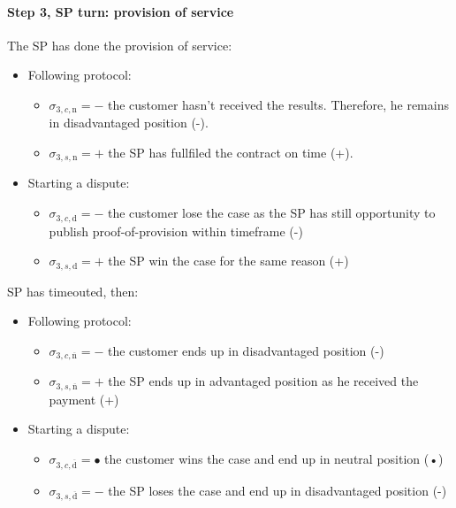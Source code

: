 \documentclass{ieeeaccess}
\begin{document}
\paragraph{Step 3, SP turn: provision of
service}\label{step-3-provision-of-service}

The SP has done the provision of service:

\begin{itemize}
\item
  Following protocol:

  \begin{itemize}
  
  \item
    \(\sigma_{3, c, \mathrm{n}} = -\) the customer hasn't received the
    results. Therefore, he remains in disadvantaged position (-).
  \item
    \(\sigma_{3, s, \mathrm{n}} = +\) the SP has fullfiled the contract
    on time (+).
  \end{itemize}
\item
  Starting a dispute:

  \begin{itemize}
  
  \item
    \(\sigma_{3, c, \mathrm{d}} = -\) the customer lose the case as the
    SP has still opportunity to publish proof-of-provision within
    timeframe (-)
  \item
    \(\sigma_{3, s, \mathrm{d}} = +\) the SP win the case for the same
    reason (+)
  \end{itemize}
\end{itemize}

SP has timeouted, then:

\begin{itemize}
\item
  Following protocol:

  \begin{itemize}
  
  \item
    \(\sigma_{3, c, \overline{\mathrm{n}}} = -\) the customer ends up in
    disadvantaged position (-)
  \item
    \(\sigma_{3, s, \overline{\mathrm{n}}} = +\) the SP ends up in
    advantaged position as he received the payment (+)
  \end{itemize}
\item
  Starting a dispute:

  \begin{itemize}
  
  \item
    \(\sigma_{3, c, \overline{\mathrm{d}}} = •\) the customer wins the
    case and end up in neutral position (•)
  \item
    \(\sigma_{3, s, \overline{\mathrm{d}}} = -\) the SP loses the case
    and end up in disadvantaged position (-)
  \end{itemize}
\end{itemize}
\end{document}
